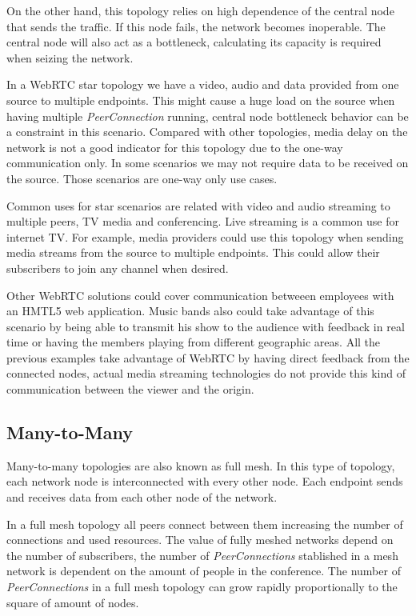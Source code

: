 On the other hand, this topology relies on high dependence of the central node that sends the traffic. If this node fails, the network becomes inoperable. The central node will also act as a bottleneck, calculating its capacity is required when seizing the network.

In a WebRTC star topology we have a video, audio and data provided from one source to multiple endpoints. This might cause a huge load on the source when having multiple {\it PeerConnection} running, central node bottleneck behavior can be a constraint in this scenario. Compared with other topologies, media delay on the network is not a good indicator for this topology due to the one-way communication only. In some scenarios we may not require data to be received on the source. Those scenarios are one-way only use cases.

Common uses for star scenarios are related with video and audio streaming to multiple peers, TV media and conferencing. Live streaming is a common use for internet TV. For example, media providers could use this topology when sending media streams from the source to multiple endpoints. This could allow their subscribers to join any channel when desired. 

Other WebRTC solutions could cover communication betweeen employees with an HMTL5 web application. Music bands also could take advantage of this scenario by being able to transmit his show to the audience with feedback in real time or having the members playing from different geographic areas. All the previous examples take advantage of WebRTC by having direct feedback from the connected nodes, actual media streaming technologies do not provide this kind of communication between the viewer and the origin.

\subsection{Many-to-Many}

Many-to-many topologies are also known as full mesh. In this type of topology, each network node is interconnected with every other node. Each endpoint sends and receives data from each other node of the network.

In a full mesh topology all peers connect between them increasing the number of connections and used resources. The value of fully meshed networks depend on the number of subscribers, the number of {\it PeerConnections} stablished in a mesh network is dependent on the amount of people in the conference. The number of {\it PeerConnections} in a full mesh topology can grow rapidly proportionally to the square of amount of nodes.

